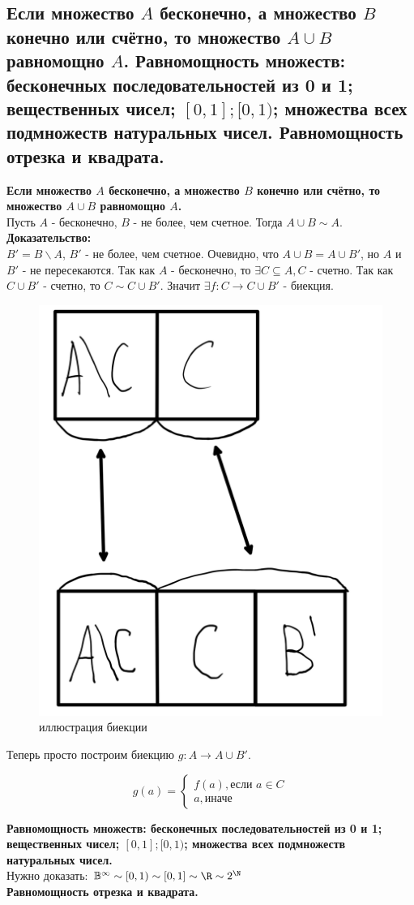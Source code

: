\subsection{Если множество $A$ бесконечно, а множество $B$ конечно или счётно, то множество $A \cup B$ равномощно $A$. Равномощность множеств: бесконечных последовательностей из 0 и 1; вещественных чисел; $[0, 1]; [0, 1)$; множества всех подмножеств натуральных чисел. Равномощность отрезка и квадрата.}
\textbf{Если множество $A$ бесконечно, а множество $B$ конечно или счётно, то множество $A \cup B$ равномощно $A$.}\\

Пусть $A$ - бесконечно, $B$ - не более, чем счетное. Тогда $A \cup B \sim A$.\\

\noindent \textbf{Доказательство:} \\

$B' = B \backslash A$, $B'$ - не более, чем счетное. Очевидно, что $A \cup B = A \cup B'$, но $A$ и $B'$ - не пересекаются.
Так как $A$ - бесконечно, то $\exists C \subseteq A, C$ - счетно. Так как $C \cup B'$ - счетно, то $C \sim C \cup B'$. Значит
$\exists f : C \to C \cup B'$ - биекция.

\begin{figure}[H]
\centering
\includegraphics[width=0.3\linewidth]{images/question16.png}
\caption{иллюстрация биекции}
\end{figure}

Теперь просто построим биекцию $g : A \to A \cup B'$.

\begin{equation*}
    g(a) = \begin{cases}
        f(a), \text{если } a \in C\\
        a, \text{иначе}
    \end{cases}
\end{equation*}

\textbf{Равномощность множеств: бесконечных последовательностей из 0 и 1; вещественных чисел; $[0, 1]; [0, 1)$; множества всех подмножеств натуральных чисел.}\\

Нужно доказать: $\mathbb{B}^{\infty} \sim [0, 1) \sim [0,1] \sim \R \sim 2^{\N}$\\



\textbf{Равномощность отрезка и квадрата.}\\
